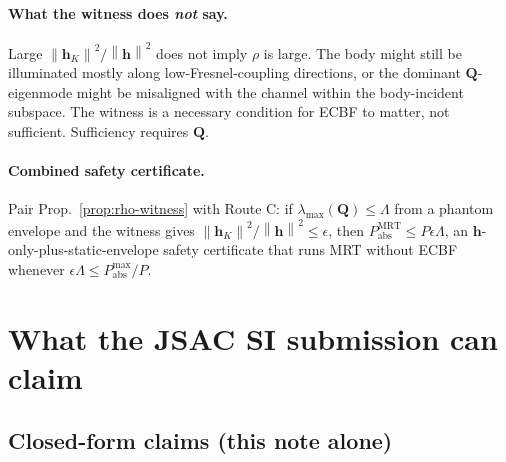 \documentclass[11pt,a4paper]{article}
\theoremstyle{definition}
\newcommand{\hh}{\mathbf{h}}
\newcommand{\Q}{\mathbf{Q}}
\newcommand{\lammax}{\lambda_{\max}}
\newcommand{\norm}[1]{\left\lVert #1 \right\rVert}
\begin{document}
\paragraph{What the witness does \emph{not} say.}
Large $\norm{\hh_K}^2/\norm{\hh}^2$ does not imply $\rho$ is large.
The body might still be illuminated mostly along low-Fresnel-coupling
directions, or the dominant $\Q$-eigenmode might be misaligned with
the channel within the body-incident subspace. The witness is a
necessary condition for ECBF to matter, not sufficient. Sufficiency
requires $\Q$.

\paragraph{Combined safety certificate.}
Pair Prop.~\ref{prop:rho-witness} with Route C: if
$\lammax(\Q)\le\Lambda$ from a phantom envelope and the witness gives
$\norm{\hh_K}^2/\norm{\hh}^2\le\epsilon$, then
$P_{\mathrm{abs}}^{\mathrm{MRT}}\le P\epsilon\Lambda$, an
$\hh$-only-plus-static-envelope safety certificate that runs MRT
without ECBF whenever $\epsilon\Lambda\le P_{\mathrm{abs}}^{\max}/P$.

\section{What the JSAC SI submission can claim}
\label{sec:writeup}

\subsection{Closed-form claims (this note alone)}
\end{document}
